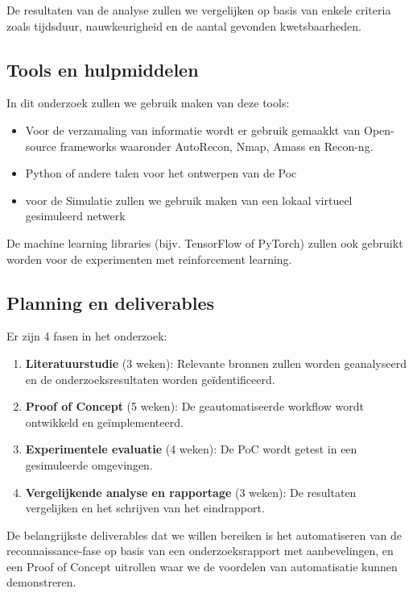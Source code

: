 De resultaten van de analyse zullen we vergelijken op basis van enkele criteria zoals tijdsduur, nauwkeurigheid en de aantal gevonden kwetsbaarheden.

\subsection{Tools en hulpmiddelen}

In dit onderzoek zullen we gebruik maken van deze tools: 

\begin{itemize}
    \item Voor de verzamaling van informatie wordt er gebruik gemaakkt van Open-source frameworks waaronder AutoRecon, Nmap, Amass en Recon-ng.
    \item Python of andere talen voor het ontwerpen van de Poc
    \item voor de Simulatie zullen we gebruik maken van een lokaal virtueel gesimuleerd netwerk
\end{itemize}

De machine learning libraries (bijv. TensorFlow of PyTorch) zullen ook gebruikt worden voor de experimenten met reinforcement learning.

\subsection{Planning en deliverables}
Er zijn 4 fasen in het onderzoek:
\begin{enumerate}
    \item \textbf{Literatuurstudie} (3 weken): Relevante bronnen zullen worden geanalyseerd en de onderzoeksresultaten worden geïdentificeerd.
    \item \textbf{Proof of Concept} (5 weken): De geautomatiseerde workflow wordt ontwikkeld en geïmplementeerd.
    \item \textbf{Experimentele evaluatie} (4 weken): De PoC wordt getest in een gesimuleerde omgevingen.
    \item \textbf{Vergelijkende analyse en rapportage} (3 weken): De resultaten vergelijken en het schrijven van het eindrapport.
\end{enumerate}

De belangrijkste deliverables dat we willen bereiken is het automatiseren van de reconnaissance-fase op
basis van een onderzoeksrapport met aanbevelingen, en een Proof of Concept uitrollen waar we de voordelen
van automatisatie kunnen demonstreren.

